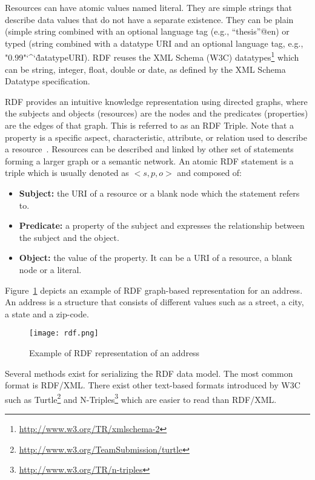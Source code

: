 Resources can have atomic values named literal. They are simple strings that describe data values that do not have a separate existence. They can be plain (simple string combined with an optional language tag (e.g., ``thesis''@en) or typed (string combined with a datatype URI and an optional language tag, e.g., "0.99"\char`\^\char`\^datatypeURI). RDF reuses the  XML Schema (W3C) datatypes\footnote{\url{http://www.w3.org/TR/xmlschema-2}} which can be string, integer, float, double or date, as defined by the XML Schema Datatype specification.

RDF provides an intuitive knowledge representation using directed graphs, where the subjects and objects (resources) are the nodes and the predicates (properties) are the edges of that graph. This is referred to as an RDF Triple. Note that a property is a specific aspect, characteristic, attribute, or relation used to describe a resource~\cite{Lassila:RDF:99}. Resources can be described and linked by other set of statements forming a larger graph or a semantic network. An atomic RDF statement is a triple which is usually denoted as $<s,p,o>$ and composed of:

\begin{itemize}
	\item \textbf{Subject:} the URI of a resource or a blank node which the statement refers to.
	\item \textbf{Predicate:} a property of the subject and expresses the relationship between the subject and the object.
	\item \textbf{Object:} the value of the property. It can be a URI of a resource, a blank node or a literal.
\end{itemize}

Figure~\ref{fig:rdfGraph} depicts an example of RDF graph-based representation for an address. An address is a structure that consists of different values such as a street, a city, a state and a zip-code.

\begin{figure}[htbp]
\centering
	\texttt{[image: rdf.png]}
	\caption{Example of RDF representation of an address}
	\label{fig:rdfGraph}
\end{figure}

Several methods exist for serializing the RDF data model. The most common format is RDF/XML. There exist other text-based formats introduced by W3C such as Turtle\footnote{\url{http://www.w3.org/TeamSubmission/turtle}} and N-Triples\footnote{\url{http://www.w3.org/TR/n-triples}} which are easier to read than RDF/XML.

